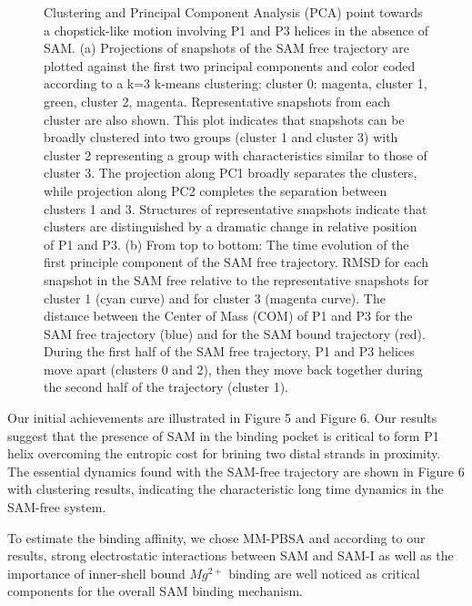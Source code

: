 \documentclass[a4paper,10pt]{article}
\begin{document}
\begin{figure}
\caption{Clustering and Principal Component Analysis (PCA) point towards a chopstick-like 
motion involving P1 and P3 helices in the absence of SAM. 
(a) Projections of snapshots of the SAM free trajectory are plotted against the first two principal 
components and color coded according to a k=3 k-means clustering: cluster 0: magenta, cluster 1, 
green, cluster 2, magenta. Representative snapshots from each cluster are also shown. This plot 
indicates that snapshots can be broadly clustered into two groups (cluster 1 and cluster 3) with 
cluster 2 representing a group with characteristics similar to those of cluster 3. The projection 
along PC1 broadly separates the clusters, while projection along PC2 completes the separation 
between clusters 1 and 3. Structures of representative snapshots indicate that clusters are 
distinguished by a dramatic change in relative position of P1 and P3. (b) From top to bottom: 
The time evolution of the first principle component of the SAM free trajectory. RMSD for each snapshot in the SAM free relative to the 
representative snapshots for cluster 1 (cyan curve) and for cluster 3 (magenta curve). The 
distance between the Center of Mass (COM) of P1 and P3 for the SAM free trajectory (blue) and for 
the SAM bound trajectory (red).  During the first half of the SAM free trajectory, P1 and P3 helices move apart 
(clusters 0 and 2), then they move back together during the second half of the trajectory (cluster 
1).}

\end{figure}

Our initial achievements are illustrated in Figure 5 and Figure 6.  Our results suggest that the presence of SAM in the binding pocket is critical to form P1 helix overcoming the entropic cost for brining two distal strands in proximity.  The essential dynamics found with the SAM-free trajectory are shown in Figure 6 with clustering results, indicating the characteristic long time dynamics in the SAM-free system. 

To estimate the binding affinity, we chose MM-PBSA and according to our results, strong electrostatic interactions between SAM and SAM-I as well as the importance of inner-shell bound $Mg^{2+}$ binding are well noticed as critical components for the overall SAM binding mechanism.  

\end{document}
